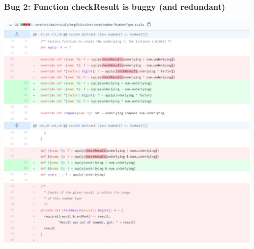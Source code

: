 \documentclass{beamer}
\begin{document}
\begin{frame}
\frametitle{Bug 2: Function checkResult is buggy (and redundant)}
\includegraphics[width=.85\textwidth]{bug2.png}
\end{frame}
\end{document}
